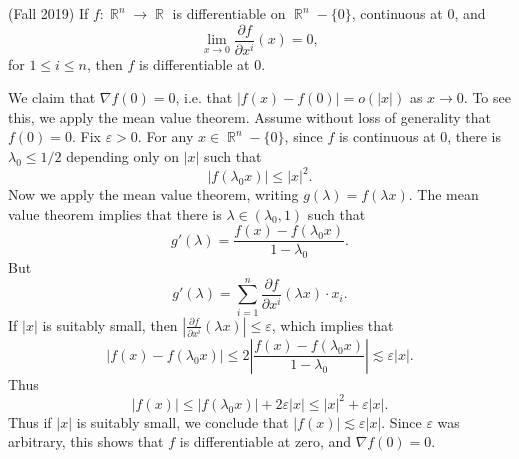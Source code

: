 \documentclass[answers]{exam}
\DeclareMathOperator{\RR}{\mathbb{R}}
\theoremstyle{problemstyle}
\newcommand{\1}[1]{\textbf{1}_{\left[#1\right]}} %
\begin{document}
\begin{questions}
\question (Fall 2019) If $f: \RR^n \to \RR$ is differentiable on $\RR^n - \{ 0 \}$, continuous at 0, and
%
\[ \lim_{x \to 0} \frac{\partial f}{\partial x^i}(x) = 0, \]
%
for $1 \leq i \leq n$, then $f$ is differentiable at 0.
\begin{solution}
	We claim that $\nabla f(0) = 0$, i.e. that $|f(x) - f(0)| = o(|x|)$ as $x \to 0$. To see this, we apply the mean value theorem. Assume without loss of generality that $f(0) = 0$. Fix $\varepsilon > 0$. For any $x \in \RR^n - \{ 0 \}$, since $f$ is continuous at $0$, there is $\lambda_0 \leq 1/2$ depending only on $|x|$ such that
	\[ |f(\lambda_0 x)| \leq |x|^2. \]
	Now we apply the mean value theorem, writing $g(\lambda) = f(\lambda x)$. The mean value theorem implies that there is $\lambda \in (\lambda_0, 1)$ such that
	\[ g'(\lambda) = \frac{f(x) - f(\lambda_0 x)}{1 - \lambda_0}. \]
	But
	\[ g'(\lambda) = \sum_{i = 1}^n \frac{\partial f}{\partial x^i}(\lambda x) \cdot x_i. \]
	If $|x|$ is suitably small, then $|\frac{\partial f}{\partial x^i}(\lambda x)| \leq \varepsilon$, which implies that
	\[ |f(x) - f(\lambda_0 x)| \leq 2 \left| \frac{f(x) - f(\lambda_0 x)}{1 - \lambda_0} \right| \lesssim \varepsilon |x|. \]
	Thus
	\[ |f(x)| \leq |f(\lambda_0 x)| + 2 \varepsilon |x| \leq |x|^2 + \varepsilon |x|. \]
	Thus if $|x|$ is suitably small, we conclude that $|f(x)| \lesssim \varepsilon |x|$. Since $\varepsilon$ was arbitrary, this shows that $f$ is differentiable at zero, and $\nabla f(0) = 0$.
\end{solution}





\end{questions}
\end{document}
